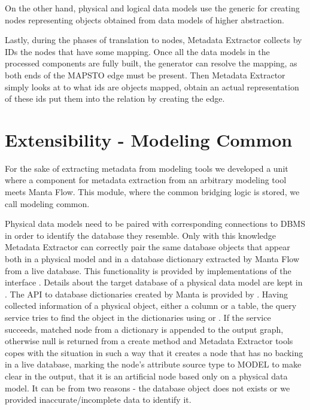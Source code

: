 On the other hand, physical and logical data models use the generic  for creating nodes representing objects obtained from data models of higher abstraction.

Lastly, during the phases of translation to nodes, Metadata Extractor collects by IDs the nodes that have some mapping.
Once all the data models in the processed components are fully built, the generator can resolve the mapping, as both ends of the MAPS\textunderscore TO edge must be present. 
Then Metadata Extractor simply looks at to what ids are objects mapped, obtain an actual representation of these ids put them into the relation by creating the edge.

\section{Extensibility - Modeling Common}
\label{modeling_common}

For the sake of extracting metadata from modeling tools we developed a unit where a component for metadata extraction from an arbitrary modeling tool meets Manta Flow.
This module, where the common bridging logic is stored, we call modeling common.

Physical data models need to be paired with corresponding connections to DBMS in order to identify the database they resemble. 
Only with this knowledge Metadata Extractor can correctly pair the same database objects that appear both in a physical model and in a database dictionary extracted by Manta Flow from a live database. 
This functionality is provided by implementations of the interface . Details about the target database of a physical data model are kept in . 
The API to database dictionaries created by Manta is provided by . 
Having collected information of a physical object, either a column or a table, the query service tries to find the object in the dictionaries using  or . 
If the service succeeds, matched node from a dictionary is appended to the output graph, otherwise null is returned from a create method and Metadata Extractor tools copes with the situation in such a way that it creates a node that has no backing in a live database, marking the node's attribute source type to MODEL to make clear in the output, that it is an artificial node based only on a physical data model. 
It can be from two reasons - the database object does not exists or we provided inaccurate/incomplete data to identify it.

